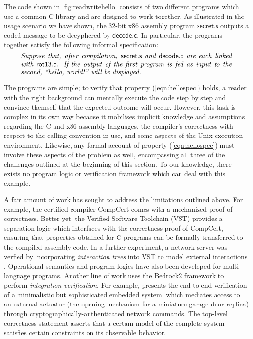 \documentclass[acmsmall,nonacm]{acmart}
\newcommand{\kw}[1]{\ensuremath{ \mathsf{#1} }}
\begin{document}
\begin{example} \label{ex:readwritehello} %
The code shown in \autoref{fig:readwritehello}
consists of two different programs which
use a common C library and
are designed to work together.
As illustrated in the usage scenario we have shown,
the 32-bit x86 assembly program \kw{secret.s} 
outputs a coded message
to be decyphered by \kw{decode.c}.
In particular,
the programs together satisfy the following informal specification:
\begin{equation}
  \begin{minipage}{.9\textwidth}
  \it
  Suppose that,
  after compilation,
  \kw{secret.s} and \kw{decode.c}
  are each linked with \kw{rot13.c}.
  If the output of the first program
  is fed as input to the second,
  ``hello, world!'' will be displayed.
  \end{minipage}
  \label{eqn:hellospec}
\end{equation}

The programs are simple;
to verify that property (\ref{eqn:hellospec}) holds,
a reader with the right background
can mentally execute the code step by step
and convince themself that the expected outcome will occur.
However, this task is complex in its own way
because it mobilises implicit knowledge and assumptions regarding
the C and x86 assembly languages,
the compiler's correctness with respect to the calling convention in use,
and some aspects of the Unix execution environment.
%
Likewise, any formal account of property (\ref{eqn:hellospec})
must involve these aspects of the problem as well,
encompassing all three of the challenges outlined at the beginning of this section.
To our knowledge,
there exists no program logic or verification framework
which can deal with this example.
\end{example}

A fair amount of work has sought to address
the limitations outlined above.
For example,
the certified compiler CompCert \citep{compcert}
comes with a mechanized proof of correctness.
Better yet,
the Verified Software Toolchain (VST) \citep{vst}
provides a separation logic which interfaces with
the correctness proof of CompCert,
ensuring that properties obtained for C programs
can be formally transferred to the compiled assembly code.
In a further experiment,
a network server was verfied
by incorporating \emph{interaction trees} into VST
to model external interactions \cite{itrees}.
Operational semantics \cite{opsem-multi} and
program logics \cite{melocoton}
have also been developed for multi-language programs.
%
Another line of work uses the Bedrock2 framework
to perform \emph{integration verification}.
For example, \citet{bedrock-iv-2}
presents the end-to-end verification of
a minimalistic but sophisticated embedded system,
which mediates access to an external actuator
(the opening mechanism for a miniature garage door replica)
through cryptographically-authenticated network commands.
The top-level correctness statement
asserts that a certain model of the complete system
satisfies certain constraints on its observable behavior.
\end{document}
